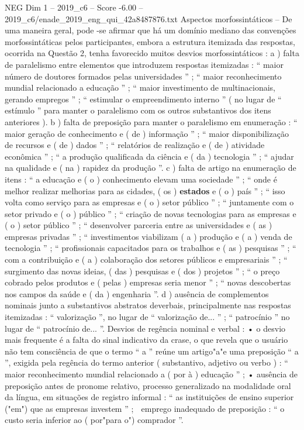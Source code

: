 \begin{textsample}{NEG Dim 1 – 2019\_c6 – Score -6.00 – 2019\_c6/enade\_2019\_eng\_qui\_42a8487876.txt}
Aspectos morfossintáticos – De uma maneira geral, pode -se afirmar que há um domínio mediano das convenções morfossintáticas pelos participantes, embora a estrutura itemizada das respostas, ocorrida na Questão 2, tenha favorecido muitos desvios morfossintáticos : a ) falta de paralelismo entre elementos que introduzem respostas itemizadas : “ maior número de doutores formados pelas universidades ” ; “ maior reconhecimento mundial relacionado a educação ” ; “ maior investimento de multinacionais, gerando empregos ” ; “ estimular o empreendimento interno ” ( no lugar de “ estímulo ” para manter o paralelismo com os outros substantivos dos itens anteriores ). b ) falta de preposição para manter o paralelismo em enumeração : “ maior geração de conhecimento e ( de ) informação ” ; “ maior disponibilização de recursos e ( de ) dados ” ; “ relatórios de realização e ( de ) atividade econômica ” ; “ a produção qualificada da ciência e ( da ) tecnologia ” ; “ ajudar na qualidade e ( na ) rapidez da produção ”. c ) falta de artigo na enumeração de itens : “ a educação e ( o ) conhecimento elevam uma sociedade ” ; “ onde é melhor realizar melhorias para as cidades, ( os ) \textbf{estados} e ( o ) país ” ; “ isso volta como serviço para as empresas e ( o ) setor público ” ; “ juntamente com o setor privado e ( o ) público ” ; “ criação de novas tecnologias para as empresas e ( o ) setor público ” ; “ desenvolver parceria entre as universidades e ( as ) empresas privadas ” ; “ investimentos viabilizam ( a ) produção e ( a ) venda de tecnologia ” ; “ profissionais capacitados para os trabalhos e ( as ) pesquisas ” ; “ com a contribuição e ( a ) colaboração dos setores públicos e empresariais ” ; “ surgimento das novas ideias, ( das ) pesquisas e ( dos ) projetos ” ; “ o preço cobrado pelos produtos e ( pelas ) empresas seria menor ” ; “ novas descobertas nos campos da saúde e ( da ) engenharia ”. d ) ausência de complementos nominais junto a substantivos abstratos deverbais, principalmente nas respostas itemizadas : “ valorização ”, no lugar de “ valorização de... ” ; “ patrocínio ” no lugar de “ patrocínio de... ”.
Desvios de regência nominal e verbal : • o desvio mais frequente é a falta do sinal indicativo da crase, o que revela que o usuário não tem consciência de que o termo “ a ” reúne um artigo"a"e uma preposição “ a ”, exigida pela regência do termo anterior ( substantivo, adjetivo ou verbo ) : “ maior reconhecimento mundial relacionado a ( por à ) educação ” ; • ausência de preposição antes de pronome relativo, processo generalizado na modalidade oral da língua, em situações de registro informal : “ as instituições de ensino superior ("em") que as empresas investem ” ;  emprego inadequado de preposição : “ o custo seria inferior ao ( por"para o") comprador ”.

\end{textsample}
